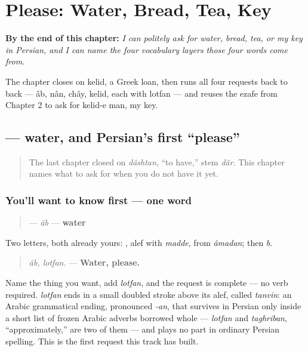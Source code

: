 
\chapter{Please: Water, Bread, Tea, Key}
\label{ch:fa-please-requests}

\begin{chapteropening}
\textbf{By the end of this chapter:} \emph{I can politely ask for water, bread, tea, or my key in Persian, and I can name the four vocabulary layers those four words come from.}

The chapter closes on kelid, a Greek loan, then runs all four requests back to back — âb, nân, chây, kelid, each with lotfan — and reuses the ezafe from Chapter 2 to ask for kelid-e man, my key.
\end{chapteropening}

\section[\texorpdfstring{\fa{آب} (âb)}{آب (âb)}]{ — water, and Persian's first \textquotedblleft{}please\textquotedblright{}}

\label{lesson:FA-C09-ab}



\begin{quote}
The last chapter closed on \emph{dâshtan}, “to have,” stem \emph{dâr}. This chapter names what to ask for when you do not have it yet.
\end{quote}

\subsection*{You'll want to know first — one word}
\begin{quote}
\textbf{} — \emph{âb} — \textbf{water}
\end{quote}

Two letters, both already yours: \textbf{}, alef with \emph{madde}, from \emph{âmadan}; then \textbf{} \emph{b}.

\begin{grammarlens}[title={Grammar Lens: your first Persian \textquotedblleft{}please\textquotedblright{}}]
\begin{quote}
\emph{âb, lotfan.} — \textbf{Water, please.}
\end{quote}

Name the thing you want, add \emph{lotfan}, and the request is complete — no verb required. \emph{lotfan} ends in a small doubled stroke above its alef, called \emph{tanvin}: an Arabic grammatical ending, pronounced \emph{-an}, that survives in Persian only inside a short list of frozen Arabic adverbs borrowed whole — \emph{lotfan} and \emph{taghriban}, “approximately,” are two of them — and plays no part in ordinary Persian spelling. This is the first request this track has built.
\end{grammarlens}

